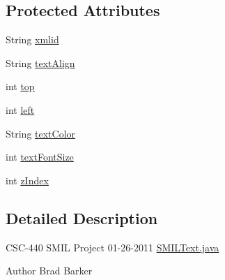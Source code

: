 \subsection*{Protected Attributes}
\begin{DoxyCompactItemize}
\item 
String \hyperlink{classcsc440_1_1nuf_1_1components_1_1_s_m_i_l_text_a78a68077966f0348c75d1d504db42828}{xmlid}
\item 
String \hyperlink{classcsc440_1_1nuf_1_1components_1_1_s_m_i_l_text_a74e840fdb88a2db5fc40abcd973e9550}{text\-Align}
\item 
int \hyperlink{classcsc440_1_1nuf_1_1components_1_1_s_m_i_l_text_a66c25a146ade90fb42a6f63a6198ddd7}{top}
\item 
int \hyperlink{classcsc440_1_1nuf_1_1components_1_1_s_m_i_l_text_a8d51549a85efeaf18a85837154449da9}{left}
\item 
String \hyperlink{classcsc440_1_1nuf_1_1components_1_1_s_m_i_l_text_a014665b36e792464e32589735dc9d25b}{text\-Color}
\item 
int \hyperlink{classcsc440_1_1nuf_1_1components_1_1_s_m_i_l_text_a1cc323cc7543c674087e2b600a04000d}{text\-Font\-Size}
\item 
int \hyperlink{classcsc440_1_1nuf_1_1components_1_1_s_m_i_l_text_a4fbd664e16a4127c890a35f416f96e18}{z\-Index}
\end{DoxyCompactItemize}


\subsection{Detailed Description}
C\-S\-C-\/440 S\-M\-I\-L Project 01-\/26-\/2011 \hyperlink{_s_m_i_l_text_8java}{S\-M\-I\-L\-Text.\-java} \begin{DoxyAuthor}{Author}
Brad Barker 
\end{DoxyAuthor}


